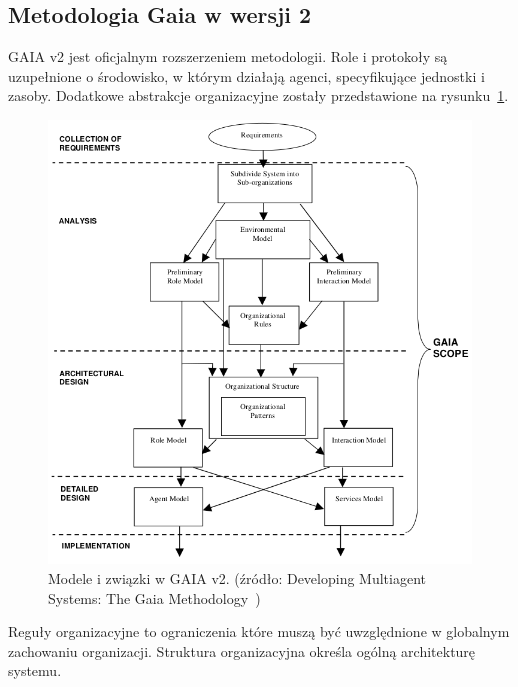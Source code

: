\documentclass[11pt]{report}
\begin{document}
    \subsection{Metodologia Gaia w wersji 2}
    GAIA v2 jest oficjalnym rozszerzeniem metodologii.
    Role i protokoły są uzupełnione o środowisko, w którym działają agenci, specyfikujące jednostki i zasoby.
    Dodatkowe abstrakcje organizacyjne zostały przedstawione na rysunku~\ref{fig:gaia_v2}.
    \begin{figure}[!ht]
        \centering
        \includegraphics[width=\linewidth]{fig/gaia2 models.png}
        \caption{Modele i związki w GAIA v2. (źródło: Developing Multiagent Systems: The Gaia Methodology~\cite{Zambonelli2003})}
        \label{fig:gaia_v2}
    \end{figure}
    Reguły organizacyjne to ograniczenia które muszą być uwzględnione w globalnym zachowaniu organizacji.
    Struktura organizacyjna określa ogólną architekturę systemu.
\end{document}

